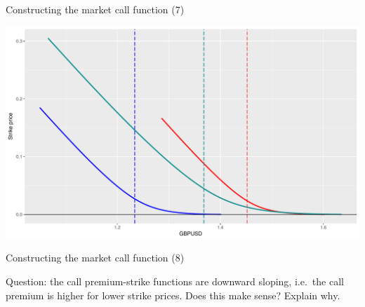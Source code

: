 \begin{frame}{Constructing the market call function (7)}

\includegraphics[width=0.9\linewidth]{2018_02_07_IMF_FXCourse_files/figure-beamer/unnamed-chunk-44-1}

\end{frame}

\begin{frame}{Constructing the market call function (8)}

Question: the call premium-strike functions are downward sloping,
i.e.~the call premium is higher for lower strike prices. Does this make
sense? Explain why.

\end{frame}

